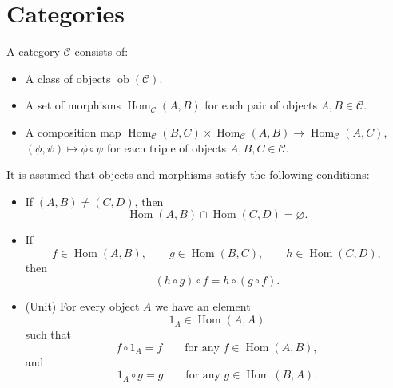 \section{Categories}

\begin{definition}
    A category $\mathcal{C}$ consists of:
    \begin{itemize}
        \item A class of objects $\operatorname{ob}(\mathcal{C})$.
        \item A set of morphisms $\operatorname{Hom}_{\mathcal{C}}(A, B)$ for each pair of objects $A, B \in \mathcal{C}$.
        \item A composition map $\operatorname{Hom}_{\mathcal{C}}(B, C) \times \operatorname{Hom}_{\mathcal{C}}(A, B) \to \operatorname{Hom}_{\mathcal{C}}(A, C)$, $(\phi, \psi) \mapsto \phi \circ \psi$ for each triple of objects $A, B, C \in \mathcal{C}$.
    \end{itemize}
\end{definition}

It is assumed that objects and morphisms satisfy the following conditions:
\begin{itemize}
    \item If $(A,B)\neq (C,D)$, then
          \[
              \operatorname{Hom}(A,B)\cap \operatorname{Hom}(C,D)=\varnothing.
          \]

    \item If
          \[
              f\in \operatorname{Hom}(A,B), \qquad
              g\in \operatorname{Hom}(B,C), \qquad
              h\in \operatorname{Hom}(C,D),
          \]
          then
          \[
              (h\circ g)\circ f = h\circ (g\circ f).
          \]

    \item (Unit) For every object $A$ we have an element
          \[
              1_A \in \operatorname{Hom}(A,A)
          \]
          such that
          \[
              f\circ 1_A = f \qquad \text{for any } f\in \operatorname{Hom}(A,B),
          \]
          and
          \[
              1_A\circ g = g \qquad \text{for any } g\in \operatorname{Hom}(B,A).
          \]
\end{itemize}

